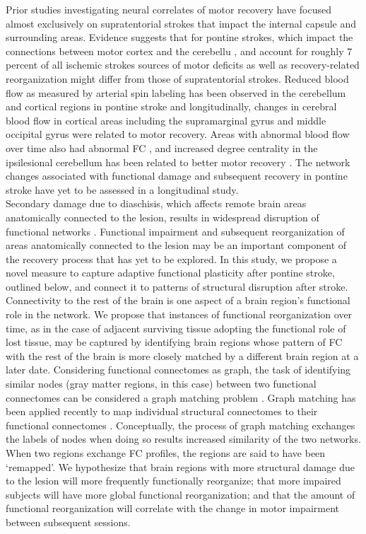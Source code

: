 \documentclass[10pt]{article}
\begin{document}
	Prior studies investigating neural correlates of motor recovery have focused almost exclusively on supratentorial strokes that impact the internal capsule and surrounding areas. Evidence suggests that for pontine strokes, which impact the  connections between motor cortex and the cerebellu \cite{Lu2011-ow}, and account for roughly 7 percent of all ischemic strokes \cite{Saia2009-ik} sources of motor deficits as well as recovery-related reorganization might differ from those of supratentorial strokes. Reduced blood flow as measured by arterial spin labeling has been observed in the cerebellum and cortical regions in pontine stroke \cite{Wei2020-gj, Wang2019-jr} and longitudinally, changes in cerebral blood flow in cortical areas including the supramarginal gyrus and middle occipital gyrus were related to motor recovery. Areas with abnormal blood flow over time also had abnormal FC \cite{Wei2020-gj}, and increased degree centrality in the ipsilesional cerebellum has been related to better motor recovery \cite{Liu2019-mj}. The network changes associated with functional damage and subsequent recovery in pontine stroke have yet to be assessed in a longitudinal study.
	\\
	
	Secondary damage due to diaschisis, which affects remote brain areas anatomically connected to the lesion, results in widespread disruption of functional networks \cite{Carrera2014-ah}. Functional impairment and subsequent reorganization of areas anatomically connected to the lesion may be an important component of the recovery process that has yet to be explored. In this study, we propose a novel measure to capture adaptive functional plasticity after pontine stroke, outlined below, and connect it to patterns of structural disruption after stroke. 
	\\
	
	Connectivity to the rest of the brain is one aspect of a brain region's functional role in the network. We propose that instances of functional reorganization over time, as in the case of adjacent surviving tissue adopting the functional role of lost tissue, may be captured by identifying brain regions whose pattern of FC with the rest of the brain is more closely matched by a different brain region at a later date. Considering functional connectomes as graph, the task of identifying similar nodes (gray matter regions, in this case) between two functional connectomes can be considered a graph matching problem \cite{Conte2004-ro}. Graph matching has been applied recently to map individual structural connectomes to their functional connectomes \cite{Osmanlioglu2019-ao}. Conceptually, the process of graph matching exchanges the labels of nodes when doing so results increased similarity of the two networks. When two regions exchange FC profiles, the regions are said to have been ‘remapped’. We hypothesize that brain regions with more structural damage due to the lesion will more frequently functionally reorganize; that more impaired subjects will have more global functional reorganization; and that the amount of functional reorganization will correlate with the change in motor impairment between subsequent sessions.
	
\end{document}

